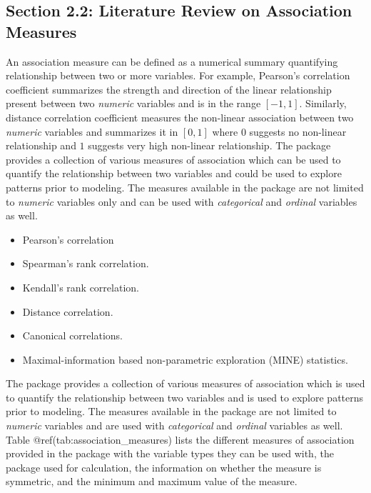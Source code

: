 \hypertarget{section-2.2-literature-review-on-association-measures}{%
\subsection{Section 2.2: Literature Review on Association
Measures}\label{section-2.2-literature-review-on-association-measures}}

An association measure can be defined as a numerical summary quantifying
relationship between two or more variables. For example, Pearson's
correlation coefficient summarizes the strength and direction of the
linear relationship present between two \emph{numeric} variables and is
in the range \([-1,1]\). Similarly, distance correlation coefficient
measures the non-linear association between two \emph{numeric} variables
and summarizes it in \([0,1]\) where \(0\) suggests no non-linear
relationship and \(1\) suggests very high non-linear relationship. The
package provides a collection of various measures of association which
can be used to quantify the relationship between two variables and could
be used to explore patterns prior to modeling. The measures available in
the package are not limited to \emph{numeric} variables only and can be
used with \emph{categorical} and \emph{ordinal} variables as well.

\begin{itemize}
\item Pearson's correlation
\item Spearman's rank correlation.
\item Kendall's rank correlation.
\item Distance correlation.
\item Canonical correlations.
\item Maximal-information based non-parametric exploration (MINE) statistics.
\end{itemize}

The package provides a collection of various measures of association
which is used to quantify the relationship between two variables and is
used to explore patterns prior to modeling. The measures available in
the package are not limited to \emph{numeric} variables and are used
with \emph{categorical} and \emph{ordinal} variables as well. Table
@ref(tab:association\_measures) lists the different measures of
association provided in the package with the variable types they can be
used with, the package used for calculation, the information on whether
the measure is symmetric, and the minimum and maximum value of the
measure.

